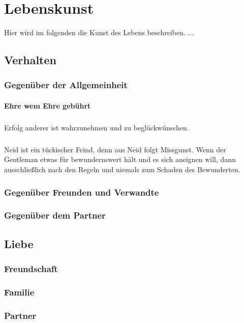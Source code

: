 \chapter{Lebenskunst} 
    \begin{thesis_quotation}
    \end{thesis_quotation}
    
    Hier wird im folgenden die Kunst des Lebens beschreiben. ...
      
    \section{Verhalten}
        \subsection{Gegenüber der Allgemeinheit}
            \subsubsection{Ehre wem Ehre gebührt}
                \paragraph{} Erfolg anderer ist wahrzunehmen und zu beglückwünschen.
                \paragraph{} Neid ist ein tückischer Feind, denn aus Neid folgt Missgunst. Wenn der Gentleman etwas für bewundernswert hält und es sich aneignen will, dann ausschließlich
                nach den Regeln und niemals zum Schaden des Bewunderten.
        \subsection{Gegenüber Freunden und Verwandte}        
        \subsection{Gegenüber dem Partner}
    \section{Liebe}
        \subsection{Freundschaft}
        \subsection{Familie}
        \subsection{Partner}
            
    
